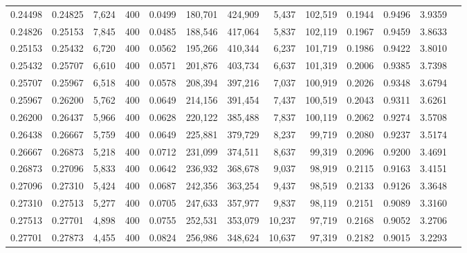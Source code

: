 \begin{tabular}{rrrrrrrrrrrrr}
0.24498 & 0.24825 &  7,624 &   400 &                                     0.0499 & 180,701 & 424,909 &   5,437 & 102,519 & 0.1944 & 0.9496 & 3.9359 \\
0.24826 & 0.25153 &  7,845 &   400 &                                     0.0485 & 188,546 & 417,064 &   5,837 & 102,119 & 0.1967 & 0.9459 & 3.8633 \\
0.25153 & 0.25432 &  6,720 &   400 &                                     0.0562 & 195,266 & 410,344 &   6,237 & 101,719 & 0.1986 & 0.9422 & 3.8010 \\
0.25432 & 0.25707 &  6,610 &   400 &                                     0.0571 & 201,876 & 403,734 &   6,637 & 101,319 & 0.2006 & 0.9385 & 3.7398 \\
0.25707 & 0.25967 &  6,518 &   400 &                                     0.0578 & 208,394 & 397,216 &   7,037 & 100,919 & 0.2026 & 0.9348 & 3.6794 \\
0.25967 & 0.26200 &  5,762 &   400 &                                     0.0649 & 214,156 & 391,454 &   7,437 & 100,519 & 0.2043 & 0.9311 & 3.6261 \\
0.26200 & 0.26437 &  5,966 &   400 &                                     0.0628 & 220,122 & 385,488 &   7,837 & 100,119 & 0.2062 & 0.9274 & 3.5708 \\
0.26438 & 0.26667 &  5,759 &   400 &                                     0.0649 & 225,881 & 379,729 &   8,237 &  99,719 & 0.2080 & 0.9237 & 3.5174 \\
0.26667 & 0.26873 &  5,218 &   400 &                                     0.0712 & 231,099 & 374,511 &   8,637 &  99,319 & 0.2096 & 0.9200 & 3.4691 \\
0.26873 & 0.27096 &  5,833 &   400 &                                     0.0642 & 236,932 & 368,678 &   9,037 &  98,919 & 0.2115 & 0.9163 & 3.4151 \\
0.27096 & 0.27310 &  5,424 &   400 &                                     0.0687 & 242,356 & 363,254 &   9,437 &  98,519 & 0.2133 & 0.9126 & 3.3648 \\
0.27310 & 0.27513 &  5,277 &   400 &                                     0.0705 & 247,633 & 357,977 &   9,837 &  98,119 & 0.2151 & 0.9089 & 3.3160 \\
0.27513 & 0.27701 &  4,898 &   400 &                                     0.0755 & 252,531 & 353,079 &  10,237 &  97,719 & 0.2168 & 0.9052 & 3.2706 \\
0.27701 & 0.27873 &  4,455 &   400 &                                     0.0824 & 256,986 & 348,624 &  10,637 &  97,319 & 0.2182 & 0.9015 & 3.2293 \\

\end{tabular}
